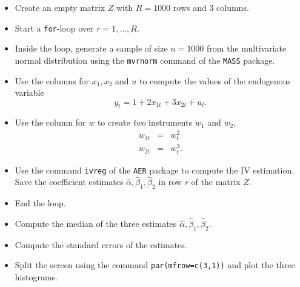 \documentclass{article}
\begin{document}
\begin{itemize}
\item Create an empty matrix $Z$ with $R=1000$ rows and 3 columns.

\item Start a \texttt{for}-loop over $r=1,\ldots ,R$.

\item Inside the loop, generate a sample of size $n=1000$ from the
multivariate normal distribution using the \texttt{mvrnorm} command of the
\texttt{MASS} package.

\item Use the columns for $x_{1},x_{2}$ and $u$ to compute the values of the
endogenous variable%
\begin{equation*}
y_{t}=1+2x_{1t}+3x_{2t}+u_{t}.
\end{equation*}

\item Use the column for $w$ to create \emph{two} instruments $w_{1}$ and $%
w_{2}$,%
\begin{eqnarray*}
w_{1t} &=&w_{t}^{2} \\
w_{2t} &=&w_{t}^{3}.
\end{eqnarray*}

\item Use the command \texttt{ivreg} of the \texttt{AER} package to compute
the IV estimation. Save the coefficient estimates $\hat{\alpha},\hat{\beta}%
_{1},\hat{\beta}_{2}$ in row $r$ of the matrix $Z$.

\item End the loop.

\item Compute the median of the three estimates $\hat{\alpha},\hat{\beta}%
_{1},\hat{\beta}_{2}$.

\item Compute the standard errors of the estimates.

\item Split the screen using the command \texttt{par(mfrow=c(3,1))} and plot
the three histograms.
\end{itemize}
\end{document}
